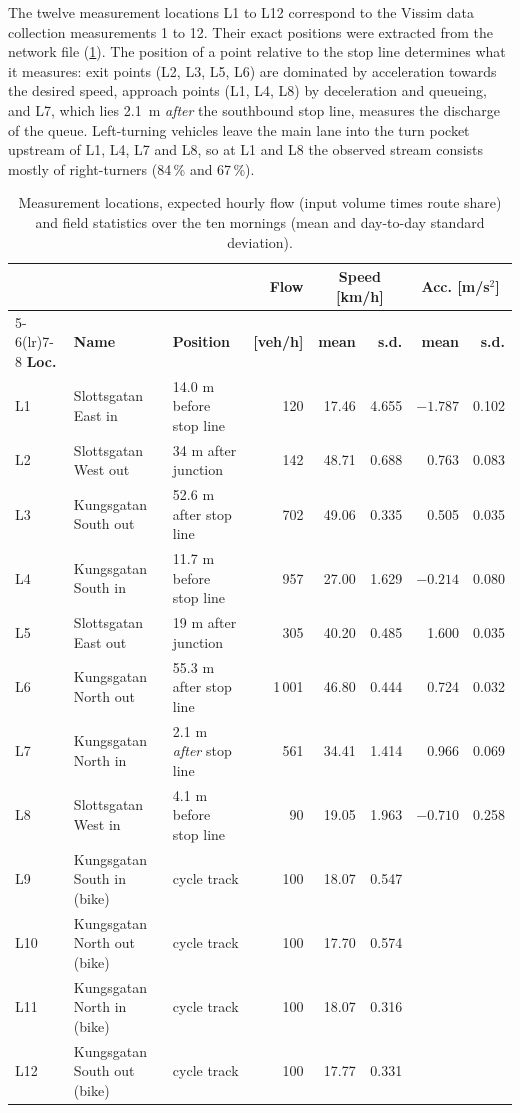 \documentclass[11pt,a4paper]{article}
\begin{document}
The twelve measurement locations L1 to L12 correspond to the Vissim data collection measurements
1 to 12. Their exact positions were extracted from the network file (\cref{tab:locations}). The
position of a point relative to the stop line determines what it measures: exit points (L2, L3,
L5, L6) are dominated by acceleration towards the desired speed, approach points (L1, L4, L8) by
deceleration and queueing, and L7, which lies 2.1~m \emph{after} the southbound stop line,
measures the discharge of the queue. Left-turning vehicles leave the main lane into the turn
pocket upstream of L1, L4, L7 and L8, so at L1 and L8 the observed stream consists mostly of
right-turners (84\,\% and 67\,\%).

\begin{table}[!htb]
\centering
\caption[Measurement locations and field statistics]{Measurement locations, expected hourly flow
(input volume times route share) and field statistics over the ten mornings (mean and day-to-day
standard deviation).}
\label{tab:locations}
\footnotesize
\setlength{\tabcolsep}{4pt}
\begin{tabular}{lllrrrrr}
\toprule
& & & \textbf{Flow} & \multicolumn{2}{c}{\textbf{Speed [km/h]}} & \multicolumn{2}{c}{\textbf{Acc. [m/s$^2$]}}\\
\cmidrule(lr){5-6}\cmidrule(lr){7-8}
\textbf{Loc.} & \textbf{Name} & \textbf{Position} & \textbf{[veh/h]} & \textbf{mean} & \textbf{s.d.} & \textbf{mean} & \textbf{s.d.}\\
\midrule
L1  & Slottsgatan East in   & 14.0 m before stop line      & 120    & 17.46 & 4.655 & $-1.787$ & 0.102\\
L2  & Slottsgatan West out  & 34 m after junction          & 142    & 48.71 & 0.688 & 0.763    & 0.083\\
L3  & Kungsgatan South out  & 52.6 m after stop line       & 702    & 49.06 & 0.335 & 0.505    & 0.035\\
L4  & Kungsgatan South in   & 11.7 m before stop line      & 957    & 27.00 & 1.629 & $-0.214$ & 0.080\\
L5  & Slottsgatan East out  & 19 m after junction          & 305    & 40.20 & 0.485 & 1.600    & 0.035\\
L6  & Kungsgatan North out  & 55.3 m after stop line       & 1\,001 & 46.80 & 0.444 & 0.724    & 0.032\\
L7  & Kungsgatan North in   & 2.1 m \emph{after} stop line & 561    & 34.41 & 1.414 & 0.966    & 0.069\\
L8  & Slottsgatan West in   & 4.1 m before stop line       & 90     & 19.05 & 1.963 & $-0.710$ & 0.258\\
\midrule
L9  & Kungsgatan South in (bike)  & cycle track & 100 & 18.07 & 0.547 & & \\
L10 & Kungsgatan North out (bike) & cycle track & 100 & 17.70 & 0.574 & & \\
L11 & Kungsgatan North in (bike)  & cycle track & 100 & 18.07 & 0.316 & & \\
L12 & Kungsgatan South out (bike) & cycle track & 100 & 17.77 & 0.331 & & \\
\bottomrule
\end{tabular}
\end{table}
\end{document}

